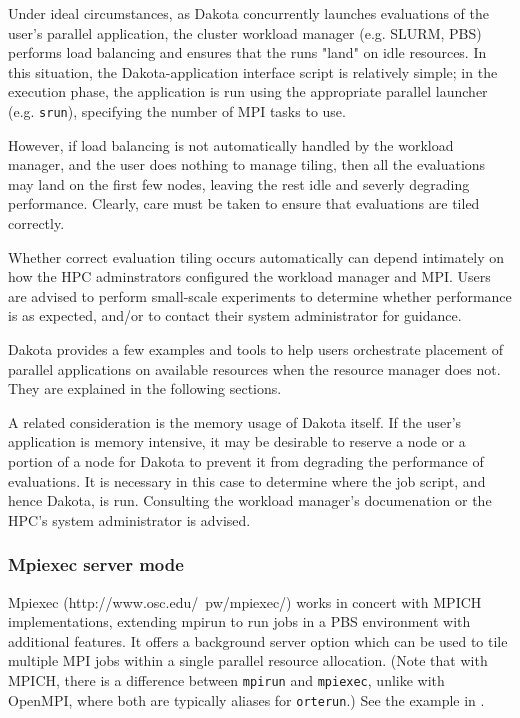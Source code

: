 Under ideal circumstances, as Dakota concurrently launches evaluations of the user's 
parallel application, the cluster workload manager (e.g. SLURM, PBS) performs load 
balancing and ensures that the runs "land" on idle resources. In this situation, the 
Dakota-application interface script is relatively simple; in the execution phase, 
the application is run using the appropriate parallel launcher (e.g. 
{\tt srun}), specifying the number of MPI tasks to use.

However, if load balancing is not automatically handled by the workload manager,
and the user does nothing to manage tiling, then all the evaluations may land on 
the first few nodes, leaving the rest idle and severly degrading performance. 
Clearly, care must be taken to ensure that evaluations are tiled correctly.

Whether correct evaluation tiling occurs automatically can depend intimately on 
how the HPC adminstrators configured the workload manager and MPI.
Users are advised to perform small-scale experiments to determine whether 
performance is as expected, and/or to contact their system administrator for guidance.

Dakota provides a few examples and tools to help users orchestrate placement of
parallel applications on available resources when the resource manager does not.
They are explained in the following sections.

A related consideration is the memory usage of Dakota itself. If the user's 
application is memory intensive, it may be desirable to reserve a node or 
a portion of a node for Dakota to prevent it from degrading the performance 
of evaluations. It is necessary in this case to determine where the job script, 
and hence Dakota, is run. Consulting the workload manager's documenation
or the HPC's system administrator is advised.

\subsubsection{Mpiexec server mode}

Mpiexec (http://www.osc.edu/~pw/mpiexec/) works in concert with MPICH
implementations, extending mpirun to run jobs in a PBS environment
with additional features.  It offers a background server option which
can be used to tile multiple MPI jobs within a single parallel
resource allocation.  (Note that with MPICH, there is a difference
between {\tt mpirun} and {\tt mpiexec}, unlike with OpenMPI, where
both are typically aliases for {\tt orterun}.)  See the example in
.

